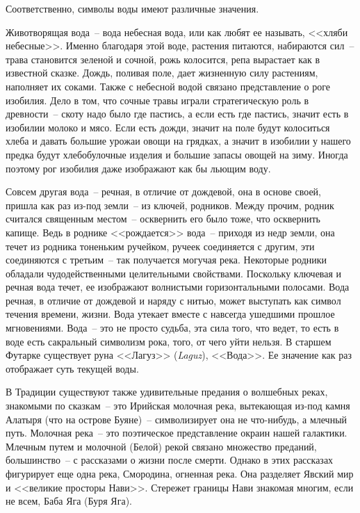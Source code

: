 \documentclass[pscyr,titlepage,chapters]{hedreport}
\begin{document}
  Соответственно, символы воды имеют различные значения.

  Животворящая вода~-- вода небесная вода, или как любят ее называть, <<хляби
  небесные>>. Именно
  благодаря этой воде, растения питаются, набираются сил~-- трава становится
  зеленой и сочной, рожь колосится, репа вырастает как в известной сказке.
  Дождь, поливая поле, дает жизненную силу растениям, наполняет их соками. Также
  с небесной водой связано представление о роге изобилия. Дело в том, что сочные
  травы играли стратегическую роль в древности~-- скоту надо было где пастись, а
  если есть где пастись, значит есть в изобилии молоко и мясо. Если есть дожди,
  значит на поле будут колоситься хлеба и давать большие урожаи овощи на
  грядках, а значит в изобилии у нашего предка будут хлебобулочные изделия и
  большие запасы овощей на зиму. Иногда поэтому рог изобилия даже изображают как
  бы льющим воду.

  Совсем другая вода~-- речная, в отличие от дождевой, она в основе своей,
  пришла как раз из-под земли~-- из ключей, родников. Между прочим, родник
  считался священным местом~-- осквернить его было тоже, что осквернить капище.
  Ведь в роднике <<рождается>> вода~-- приходя из недр земли, она течет из
  родника тоненьким ручейком, ручеек соединяется с другим, эти соединяются с
  третьим~-- так получается могучая река. Некоторые родники обладали
  чудодейственными целительными свойствами. Поскольку ключевая и речная вода
  течет, ее изображают волнистыми горизонтальными полосами. Вода речная, в
  отличие от дождевой и наряду с нитью, может выступать как символ течения
  времени, жизни. Вода утекает вместе с навсегда ушедшими прошлое мгновениями.
  Вода~-- это не просто судьба, эта сила того, что
  ведет, то есть в воде есть сакральный символизм рока, того, от чего уйти
  нельзя. В старшем Футарке существует руна <<Лагуз>> (\emph{Laguz}), <<Вода>>.
  Ее значение как раз отображает суть текущей воды.

  В Традиции существуют также удивительные предания о волшебных реках, знакомыми
  по сказкам~-- это Ирийская молочная река, вытекающая
  из-под камня Алатыря (что на острове Буяне)~-- символизирует она не
  что-нибудь, а млечный путь. Молочная река~-- это поэтическое представление
  окраин нашей галактики. Млечным путем и молочной (Белой) рекой связано
  множество преданий, большинство~-- с рассказами о жизни после смерти. Однако в
  этих рассказах фигурирует еще одна река, Смородина, огненная река. Она
  разделяет Явский мир и <<великие просторы Нави>>. Стережет границы Нави
  знакомая многим, если не всем, Баба Яга (Буря Яга).
\end{document}
